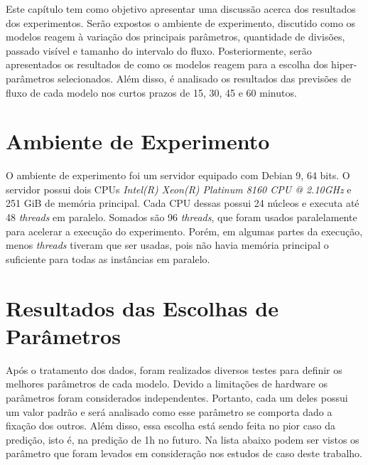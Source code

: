 Este capítulo tem como objetivo apresentar uma discussão acerca dos resultados dos experimentos. Serão expostos o ambiente de experimento, discutido como os modelos reagem à variação dos principais parâmetros, quantidade de divisões, passado visível e tamanho do intervalo do fluxo. Posteriormente, serão apresentados os resultados de como os modelos reagem para a escolha dos hiper-parâmetros selecionados. Além disso, é analisado os resultados das previsões de fluxo de cada modelo nos curtos prazos de 15, 30, 45 e 60 minutos.


\section{Ambiente de Experimento}

O ambiente de experimento foi um servidor equipado com Debian 9, 64 bits. O servidor possui dois CPUs \textit{Intel(R) Xeon(R) Platinum 8160 CPU @ 2.10GHz} e 251 GiB de memória principal. Cada CPU dessas possui 24 núcleos e executa até 48 \textit{threads} em paralelo. Somados são 96 \textit{threads}, que foram usados paralelamente para acelerar a execução do experimento. Porém, em algumas partes da execução, menos \textit{threads} tiveram que ser usadas, pois não havia memória principal o suficiente para todas as instâncias em paralelo.

\section{Resultados das Escolhas de Parâmetros}
\label{section:resultados_parametros}

Após o tratamento dos dados, foram realizados diversos testes para definir os melhores parâmetros de cada modelo. Devido a limitações de hardware os parâmetros foram considerados independentes. Portanto, cada um deles possui um valor padrão e será analisado como esse parâmetro se comporta dado a fixação dos outros. Além disso, essa escolha está sendo feita no pior caso da predição, isto é, na predição de 1h no futuro. Na lista abaixo podem ser vistos os parâmetro que foram levados em consideração nos estudos de caso deste trabalho.


